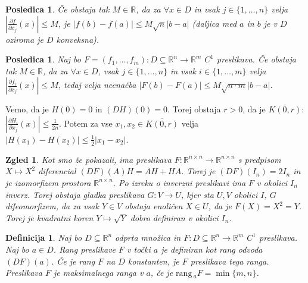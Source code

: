 \documentclass[10pt, a4paper]{article}
\newtheorem{posledica}[izr]{Posledica}
\newtheorem{defi}{Definicija}[section]
\newenvironment{noticeB}{%
  \tcolorbox[%
  notitle,
  empty,
  enhanced,  %
  breakable,
  coltext=black,
  colback=white, 
  fontupper=\rmfamily,
  parbox=false,
  noparskip,
  sharp corners,
  boxrule=-1pt,  %
  frame hidden,
  left=7pt,  %
  right=7pt,
  top=5pt,
  bottom=5pt,
  before skip=2.5ex plus 2pt,
  after skip=2.5ex plus 2pt,
  borderline west = {1.5pt}{-0.1pt}{blue!30!black}, %
  overlay unbroken and last={%
    \draw[color=black, line width=1.25pt]
    ($(frame.south west)+(1.pt, -0.1pt)$) -- ++(2em, 0);
  }
  ]}
{\endtcolorbox}
\newenvironment{definicija}{\begin{defi}\begin{noticeB}}{%
    \end{noticeB}\end{defi}}
\newtheorem{zgled}{Zgled}[section]
\newcommand{\R}{\mathbb {R}}
\newcommand{\rang}{\mathrm{\text{rang}}\,}
\begin{document}
\begin{posledica}
    Če obstaja tak $M \in \R$, da za $\forall x \in D$ in vsak $j \in \{1, \dots, n\}$ velja $\left| \frac{\partial f}{\partial x_j} (x)\right| \leq M$,
    je $|f(b) - f(a)| \leq M \sqrt{n} |b - a|$ (daljica med $a$ in $b$ je v $D$ oziroma je $D$ konveksna).
\end{posledica}

\begin{posledica}
    Naj bo $F = (f_1, \dots, f_m) : D \subseteq \R^n \to \R^m$ $C^1$ preslikava.
    Če obstaja tak $M \in \R$, da za $\forall x \in D$, vsak $j \in \{1, \dots, n\}$ in vsak $i \in \{1, \dots, m\}$
    velja $\left| \frac{\partial f_i}{\partial x_j} (x) \right| \leq M$, tedaj velja neenačba 
    $|F(b) - F(a)| \leq M \sqrt{n \cdot m} |b - a|$.
\end{posledica}

Vemo, da je $H(0) = 0$ in $(DH) (0) = 0$.
Torej obstaja $r > 0$, da je $\overline{K(0, r)}$: $\left| \frac{\partial H_i}{\partial x_j} (x) \right| \leq \frac{1}{2n}$.
Potem za vse $x_1, x_2 \in \overline{K(0, r)}$ velja $\left| H(x_1) - H(x_2) \right| \leq \frac{1}{2} |x_1 - x_2|$.

\begin{zgled}
    Kot smo že pokazali, ima preslikava $F: \R^{n \times n} \to \R^{n \times n}$ s predpisom $X \mapsto X^2$
    diferencial $(DF) (A) H = AH + HA$.
    Torej je $(DF)(I_n) = 2 I_n$ in je izomorfizem prostora $\R^{n \times n}$.
    Po izreku o inverzni preslikavi ima $F$ v okolici $I_n$ inverz.
    Torej obstaja gladka preslikava $G: V \to U$, kjer sta $U, V$ okolici $I$, $G$ difeomorfizem,
    da za vsak $Y \in V$ obstaja enoličen $X \in U$, da je $F(X) = X^2 = Y$.
    Torej je kvadratni koren $Y \mapsto \sqrt{Y}$ dobro definiran v okolici $I_n$.
\end{zgled}
\begin{definicija}
    Naj bo $D \subseteq \R^n$ odprta množica in $F: D \subseteq \R^n \to \R^m$ $C^1$ preslikava.
    Naj bo $a \in D$. Rang preslikave $F$ v točki $a$ je definiran kot rang odvoda $(DF) (a)$.
    Če je rang $F$ na $D$ konstanten, je $F$ preslikava tega ranga.
    Preslikava $F$ je maksimalnega ranga v $a$, če je $\rang_a F = \min \{m, n\}$.
\end{definicija}
\end{document}

